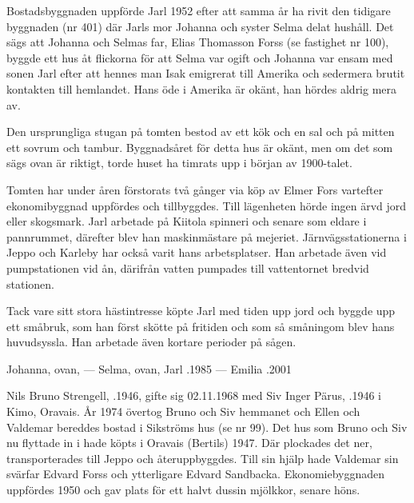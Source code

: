 Bostadsbyggnaden uppförde Jarl 1952 efter att samma år ha rivit den tidigare byggnaden (nr 401) där Jarls mor Johanna och syster Selma delat hushåll. Det sägs att Johanna och Selmas far, Elias Thomasson Forss (se fastighet nr 100), byggde ett hus åt flickorna för att Selma var ogift och Johanna var ensam med sonen Jarl efter att hennes man Isak emigrerat till Amerika och sedermera brutit kontakten till hemlandet. Hans öde i Amerika är okänt, han hördes aldrig mera av.




Den ursprungliga stugan på tomten bestod av ett kök och en sal och på mitten ett sovrum och tambur. Byggnadsåret för detta hus är okänt, men om det som sägs ovan är riktigt, torde huset ha timrats upp i början av 1900-talet.

Tomten har under åren förstorats två gånger via köp av Elmer Fors vartefter ekonomibyggnad uppfördes och tillbyggdes. Till lägenheten hörde ingen ärvd jord eller skogsmark. Jarl arbetade på Kiitola spinneri och senare som eldare i pannrummet, därefter blev han maskinmästare på mejeriet. Järnvägsstationerna i Jeppo och Karleby har också varit hans arbetsplatser. Han arbetade även vid pumpstationen vid ån, därifrån vatten pumpades till vattentornet bredvid stationen.

Tack vare sitt stora hästintresse köpte Jarl med tiden upp jord och byggde upp ett småbruk, som han först skötte på fritiden och som så småningom blev hans huvudsyssla. Han arbetade även kortare perioder på sågen.

Johanna, ovan,   ---  Selma, ovan, 
Jarl .1985  ---  Emilia .2001






Nils Bruno Strengell, .1946, gifte sig 02.11.1968 med Siv Inger Pärus, .1946 i Kimo, Oravais. År 1974 övertog Bruno och Siv hemmanet och Ellen och Valdemar bereddes bostad i Sikströms hus (se nr 99). Det hus som Bruno och Siv nu flyttade in i hade köpts i Oravais (Bertils) 1947. Där plockades det ner, transporterades till Jeppo och återuppbyggdes. Till sin hjälp hade Valdemar sin svärfar Edvard Forss och ytterligare Edvard Sandbacka. Ekonomiebyggnaden uppfördes 1950 och gav plats för ett halvt dussin mjölkkor, senare höns.

